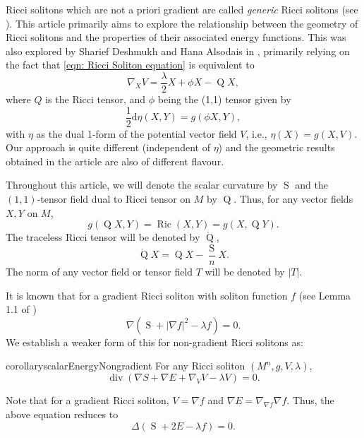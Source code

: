 \documentclass{amsart}
\newcommand{\abs}[1]{\left| #1 \right|}
\newcommand{\derivative}{\mathrm{d}}
\DeclareMathOperator*{\ricci}{Ric}
\DeclareMathOperator*{\Qricci}{Q}
\DeclareMathOperator*{\scalar}{S}
\DeclareMathOperator*{\divergence}{div}
\theoremstyle{plain}
\theoremstyle{plain}
\theoremstyle{plain}
\theoremstyle{plain}
\theoremstyle{remark}
\begin{document}
Ricci solitons which are not a priori gradient are called {\it generic} Ricci solitons (see \cite{MR3546774,MR3063556}).
This article primarily aims to explore the relationship between the geometry of Ricci solitons and the properties of their associated energy functions.
This was  also explored by Sharief Deshmukh and Hana Alsodais  in \cite{sym12020289}, primarily relying on the fact that \cref{eqn: Ricci Soliton equation} is equivalent to 
$$ \nabla_X V = \frac{\lambda}{2} X + \phi X  - \Qricci X, $$
where $Q$ is the Ricci tensor, and $\phi$ being the (1,1) tensor given by 
$$ \frac{1}{2} \derivative \eta(X,Y)=g(\phi X, Y), $$
with $\eta$ as the dual 1-form of the potential vector field $V$, i.e., 
$\eta(X) = g(X, V).$  
Our approach is quite different (independent of $\eta$)  and the geometric results obtained in the article 
are also of different flavour.



Throughout this article, we will denote the scalar curvature by $\scalar$ and the $(1,1)$-tensor field dual to Ricci tensor on $M$ by $\Qricci $. 
Thus, for any vector fields $X, Y$ on $M$, 
$$ g(\Qricci X, Y) = \ricci (X,Y) = g( X, \Qricci Y) . $$
The traceless Ricci tensor will be denoted by $\mathring{\Qricci}$,
$$ \mathring{\Qricci} X = \Qricci X - \frac{\scalar}{n} X . $$
The norm of any vector field or tensor field $T$ will be denoted by $\abs{T}$.
 


It is known that for a gradient Ricci soliton with soliton function $f$ (see Lemma 1.1  of \cite{MR2648937})
\begin{equation}\label{eqn: S + 2E - lambda f}
    \nabla (\scalar + \abs{\nabla f}^2 - \lambda f) = 0.
\end{equation}
We establish a weaker form of this for non-gradient Ricci solitons as:
\begin{restatable}{corollary}{scalarEnergyNongradient}
	\label{cor: S + 2E - lambda f for nongradient case}
	For any Ricci soliton  $(M^n,g,V,\lambda)$,    
    \begin{equation}\label{nongradient}
        \divergence ( \nabla S + \nabla E + \nabla_V V -\lambda V ) = 0 .
        \end{equation} 
\end{restatable}
Note that for a gradient Ricci soliton, $V=\nabla f$ and $\nabla E = \nabla_{\nabla f} \nabla f$. Thus, the above equation reduces to
$$ \Delta ( \scalar + 2E - \lambda f ) = 0.  $$
\end{document}

